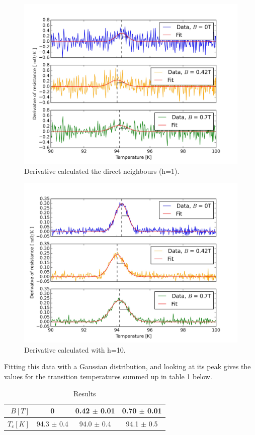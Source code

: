 \documentclass[a4paper,parskip,11pt, DIV12]{scrreprt}
\begin{document}
\begin{enumerate}
\begin{figure}[H]
\centering
\includegraphics[scale=0.1]{Criticaltemperature3}
\caption[]{Derivative calculated the direct neighbours (h=1).  }
\label{h1}
\end{figure}
\begin{figure}[H]
\centering
\includegraphics[scale=0.1]{Criticaltemperature2}
\caption[]{Derivative calculated with h=10.}
\label{meanresist}
\end{figure}

Fitting this data with a Gaussian distribution, and looking at its peak gives the values for the transition temperatures summed up in table \ref{results} below.


\begin{table}[H]
\centering
\renewcommand{\arraystretch}{1.2} %
\setlength{\tabcolsep}{3mm} %
\footnotesize
\begin{tabular}{r|ccc}
$B[T]$ & 0 & 0.42 $\pm$ 0.01 & 0.70 $\pm$ 0.01 \\ 
\hline 
$T_{c} [K]$ & 94.3 $\pm$ 0.4 & 94.0 $\pm$ 0.4 & 94.1 $\pm$ 0.5 \\ 
\end{tabular}
\caption[]{Results}
\label{results}
\end{table} 
 



\end{enumerate}
\end{document}
